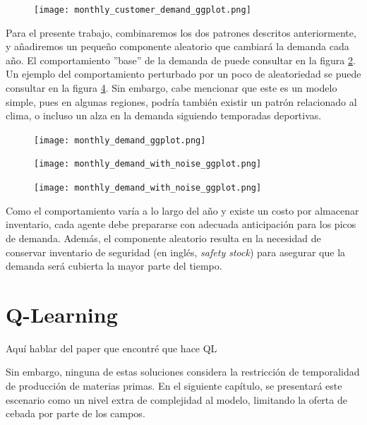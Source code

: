 \begin{figure}[h!]
\caption{ }
\label{weekly_base}
\texttt{[image: monthly\_customer\_demand\_ggplot.png]}
\centering
\end{figure}

Para el presente trabajo, combinaremos los dos patrones descritos anteriormente, y a\~nadiremos un peque\~no componente aleatorio que cambiar\'a la demanda cada a\~no. El comportamiento ''base'' de la demanda de puede consultar en la figura \ref{yearly_base}. Un ejemplo del comportamiento perturbado por un poco de aleatoriedad se puede consultar en la figura \ref{yearly_base_noisy}. Sin embargo, cabe mencionar que este es un modelo simple, pues en algunas regiones, podr\'ia tambi\'en existir un patr\'on relacionado al clima, o incluso un alza en la demanda siguiendo temporadas deportivas. \\

\begin{figure}[h!]
\caption{ }
\label{yearly_base}
\texttt{[image: monthly\_demand\_ggplot.png]}
\centering
\end{figure}

\begin{figure}[h!]
\caption{ }
\label{yearly_base_noisy}
\texttt{[image: monthly\_demand\_with\_noise\_ggplot.png]}
\centering
\end{figure}

\begin{figure}[h!]
\caption{ }
\label{yearly_base_noisy}
\texttt{[image: monthly\_demand\_with\_noise\_ggplot.png]}
\centering
\end{figure}

Como el comportamiento var\'ia a lo largo del a\~no y existe un costo por almacenar inventario, cada agente debe prepararse con adecuada anticipaci\'on para los picos de demanda. Adem\'as, el componente aleatorio resulta en la necesidad de conservar inventario de seguridad (en ingl\'es, \textit{safety stock}) para asegurar que la demanda ser\'a cubierta la mayor parte del tiempo.

\section{Q-Learning}
Aqu\'i hablar del paper que encontr\'e que hace QL \citet{Chaharsooghi}

Sin embargo, ninguna de estas soluciones considera la restricción de temporalidad de producci\'on de materias primas. En el siguiente cap\'itulo, se presentar\'a este escenario como un nivel extra de complejidad al modelo, limitando la oferta de cebada por parte de los campos.